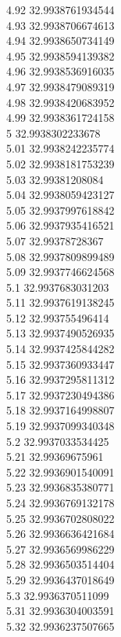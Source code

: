 {4.92	32.9938761934544\\
4.93	32.9938706674613\\
4.94	32.9938650734149\\
4.95	32.9938594139382\\
4.96	32.9938536916035\\
4.97	32.9938479089319\\
4.98	32.9938420683952\\
4.99	32.9938361724158\\
5	32.9938302233678\\
5.01	32.9938242235774\\
5.02	32.9938181753239\\
5.03	32.99381208084\\
5.04	32.9938059423127\\
5.05	32.9937997618842\\
5.06	32.9937935416521\\
5.07	32.99378728367\\
5.08	32.9937809899489\\
5.09	32.9937746624568\\
5.1	32.9937683031203\\
5.11	32.9937619138245\\
5.12	32.993755496414\\
5.13	32.9937490526935\\
5.14	32.9937425844282\\
5.15	32.9937360933447\\
5.16	32.9937295811312\\
5.17	32.9937230494386\\
5.18	32.9937164998807\\
5.19	32.9937099340348\\
5.2	32.9937033534425\\
5.21	32.99369675961\\
5.22	32.9936901540091\\
5.23	32.9936835380771\\
5.24	32.9936769132178\\
5.25	32.9936702808022\\
5.26	32.9936636421684\\
5.27	32.9936569986229\\
5.28	32.9936503514404\\
5.29	32.9936437018649\\
5.3	32.9936370511099\\
5.31	32.9936304003591\\
5.32	32.9936237507665\\
}
